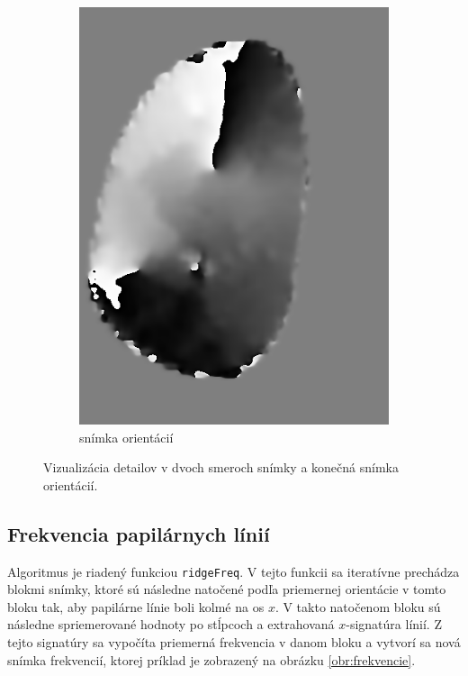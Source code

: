 \begin{figure}[h]
\begin{subfigure}[b]{0.3\linewidth}
      \includegraphics[width=\linewidth]{obrazky-figures/orientim.png}
      \caption{snímka orientácií}
    \end{subfigure}
    \caption{Vizualizácia detailov v dvoch smeroch snímky a konečná snímka orientácií.}
    \label{obr:orientacie}
  \end{figure}

  \subsection{Frekvencia papilárnych línií}
  Algoritmus je riadený funkciou \texttt{ridgeFreq}. V tejto funkcii sa iteratívne prechádza blokmi snímky, ktoré sú následne natočené podľa priemernej
  orientácie v tomto bloku tak, aby papilárne línie boli kolmé na os $x$. V takto natočenom bloku sú následne spriemerované hodnoty po stĺpcoch
  a extrahovaná $x$-signatúra línií. Z tejto signatúry sa vypočíta priemerná frekvencia v danom bloku a vytvorí sa nová snímka frekvencií, ktorej príklad
  je zobrazený na obrázku \ref{obr:frekvencie}.

